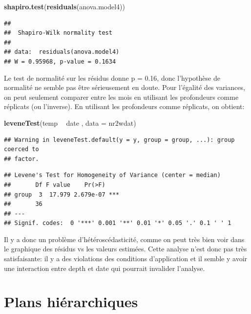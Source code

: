 \documentclass[12pt,]{book}
\newenvironment{Shaded}{\begin{snugshade}}{\end{snugshade}}
\newcommand{\DataTypeTok}[1]{\textcolor[rgb]{0.27,0.27,0.27}{#1}}
\newcommand{\KeywordTok}[1]{\textcolor[rgb]{0.27,0.27,0.27}{\textbf{#1}}}
\newcommand{\NormalTok}[1]{#1}
\newcommand{\OperatorTok}[1]{\textcolor[rgb]{0.43,0.43,0.43}{\textbf{#1}}}
\newcommand{\StringTok}[1]{\textcolor[rgb]{0.5,0.5,0.5}{#1}}
\begin{document}
\begin{Shaded}
\begin{Highlighting}[]
\KeywordTok{shapiro.test}\NormalTok{(}\KeywordTok{residuals}\NormalTok{(anova.model4))}
\end{Highlighting}
\end{Shaded}

\begin{verbatim}
## 
## 	Shapiro-Wilk normality test
## 
## data:  residuals(anova.model4)
## W = 0.95968, p-value = 0.1634
\end{verbatim}

Le test de normalité sur les résidus donne p = 0.16, donc l'hypothèse de normalité ne semble pas être sérieusement en doute. Pour l'égalité des variances, on peut seulement comparer entre les mois en utilisant les profondeurs comme réplicats (ou l'inverse). En utilisant les profondeurs comme réplicats, on obtient:

\begin{Shaded}
\begin{Highlighting}[]
\KeywordTok{leveneTest}\NormalTok{(temp }\OperatorTok{~}\StringTok{ }\NormalTok{date , }\DataTypeTok{data =}\NormalTok{ nr2wdat)}
\end{Highlighting}
\end{Shaded}

\begin{verbatim}
## Warning in leveneTest.default(y = y, group = group, ...): group coerced to
## factor.
\end{verbatim}

\begin{verbatim}
## Levene's Test for Homogeneity of Variance (center = median)
##       Df F value    Pr(>F)    
## group  3  17.979 2.679e-07 ***
##       36                      
## ---
## Signif. codes:  0 '***' 0.001 '**' 0.01 '*' 0.05 '.' 0.1 ' ' 1
\end{verbatim}

Il y a donc un problème d'hétéroscédasticité, comme on peut très bien voir dans le graphique des résidus vs les valeurs estimées. Cette analyse n'est donc pas très satisfaisante: il y a des violations des conditions d'application et il semble y avoir une interaction entre depth et date qui pourrait invalider l'analyse.

\hypertarget{plans-hiuxe9rarchiques}{%
\section{Plans hiérarchiques}\label{plans-hiuxe9rarchiques}}
\end{document}
